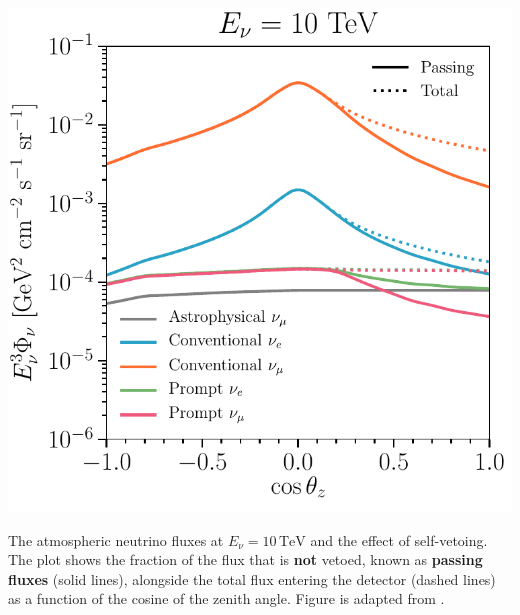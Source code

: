 \begin{marginfigure}
	\includegraphics{./figures/EventSample/fig1_fluxes_10.pdf}
	\caption[The atmospheric neutrino fluxes at \( E_\nu = 10 \, \text{TeV} \)]{The atmospheric neutrino fluxes at \( E_\nu = 10 \, \text{TeV} \) and the effect of self-vetoing. The plot shows the fraction of the flux that is \textbf{not} vetoed, known as \textbf{passing fluxes} (solid lines), alongside the total flux entering the detector (dashed lines) as a function of the cosine of the zenith angle. Figure is adapted from \cite{pass_frac}.}
\end{marginfigure}

